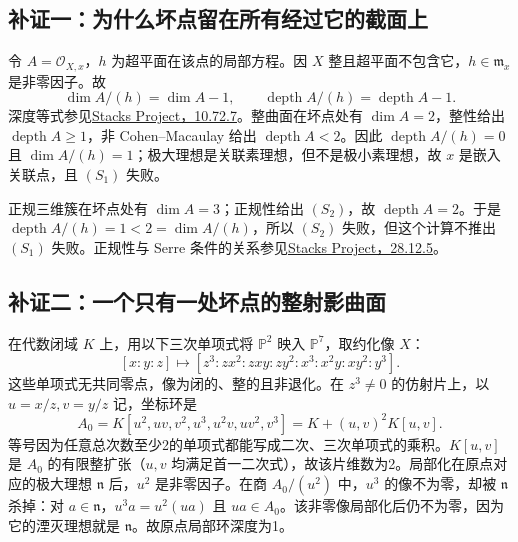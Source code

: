 \endgroup


\hypertarget{D18-101-notes}{}

\begingroup
\def\PP{\mathbb P}\def\OO{\mathcal O}\def\Ocal{\mathcal O}
\def\F{\mathcal F}\def\G{\mathcal G}\def\N{\mathcal N}
\def\PD{\check P}\def\Pdual{\check P}
\def\Ys{Y^{\mathrm{sing}}}\def\Ysing{Y^{\mathrm{sing}}}
\def\Ds{Y^{\mathrm{sup\,sing}}}\def\Ysup{Y^{\mathrm{sup\,sing}}}
\def\cod{\operatorname{codim}}\def\Sing{\operatorname{Sing}}
\def\depth{\operatorname{depth}}\def\coprof{\operatorname{coprof}}
\def\Ass{\operatorname{Ass}}\def\Supp{\operatorname{Supp}}
\def\Gr{\operatorname{Gr}}\def\Spec{\operatorname{Spec}}\def\Proj{\operatorname{Proj}}


\subsection*{补证一：为什么坏点留在所有经过它的截面上}
令 $A=\mathcal O_{X,x}$，$h$ 为超平面在该点的局部方程。因 $X$ 整且超平面不包含它，$h\in\mathfrak m_x$ 是非零因子。故
\[
 \dim A/(h)=\dim A-1,\qquad
 \depth A/(h)=\depth A-1.
\]
深度等式参见\href{https://stacks.math.columbia.edu/tag/00LE}{Stacks Project，10.72.7}。整曲面在坏点处有 $\dim A=2$，整性给出 $\depth A\ge1$，非 Cohen--Macaulay 给出 $\depth A<2$。因此 $\depth A/(h)=0$ 且 $\dim A/(h)=1$；极大理想是关联素理想，但不是极小素理想，故 $x$ 是嵌入关联点，且 $(S_1)$ 失败。

正规三维簇在坏点处有 $\dim A=3$；正规性给出 $(S_2)$，故 $\depth A=2$。于是 $\depth A/(h)=1<2=\dim A/(h)$，所以 $(S_2)$ 失败，但这个计算不推出 $(S_1)$ 失败。正规性与 Serre 条件的关系参见\href{https://stacks.math.columbia.edu/tag/033P}{Stacks Project，28.12.5}。

\subsection*{补证二：一个只有一处坏点的整射影曲面}
在代数闭域 $K$ 上，用以下三次单项式将 $\mathbb P^2$ 映入 $\mathbb P^7$，取约化像 $X$：
\[
 [x:y:z]\longmapsto
 [z^3:zx^2:zxy:zy^2:x^3:x^2y:xy^2:y^3].
\]
这些单项式无共同零点，像为闭的、整的且非退化。在 $z^3\ne0$ 的仿射片上，以 $u=x/z,v=y/z$ 记，坐标环是
\[
 A_0=K[u^2,uv,v^2,u^3,u^2v,uv^2,v^3]
       =K+(u,v)^2K[u,v].
\]
等号因为任意总次数至少2的单项式都能写成二次、三次单项式的乘积。$K[u,v]$ 是 $A_0$ 的有限整扩张（$u,v$ 均满足首一二次式），故该片维数为2。局部化在原点对应的极大理想 $\mathfrak n$ 后，$u^2$ 是非零因子。在商 $A_0/(u^2)$ 中，$u^3$ 的像不为零，却被 $\mathfrak n$ 杀掉：对 $a\in\mathfrak n$，$u^3a=u^2(ua)$ 且 $ua\in A_0$。该非零像局部化后仍不为零，因为它的湮灭理想就是 $\mathfrak n$。故原点局部环深度为1。

